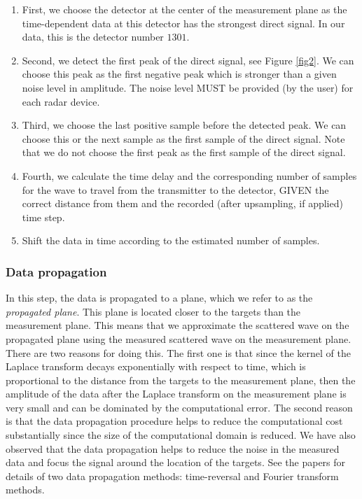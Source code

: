 \documentclass[a4paper,12pt]{article}
\begin{document}
\begin{enumerate}
   \item First, we choose the detector at the center of the measurement plane as the time-dependent data at this detector has the strongest direct signal. In our data, this is the detector number $1301$. 
   \item Second, we detect the first peak of the direct signal, see Figure \ref{fig2}. We can choose this peak as the first negative peak which is stronger than a given noise level in amplitude. The noise level MUST be provided (by the user) for each radar device. 
  \item Third, we choose the last positive sample before the detected peak. We can choose this or the next sample as the first sample of the direct signal. Note that we do not choose the first peak as the first sample of the direct signal. 
  \item Fourth, we calculate the time delay and the corresponding number of samples for the wave to travel from the transmitter to the detector, GIVEN the correct distance from them and the recorded (after upsampling, if applied) time step. 
  \item Shift the data in time according to the estimated number of samples. 
\end{enumerate}

\subsubsection{Data propagation}
In this step, the data is propagated to a plane, which we refer to as the \textit{propagated plane}.
This plane is located closer to the targets than the measurement plane. This
means that we approximate the scattered wave on the propagated plane using
the measured scattered wave on the measurement plane. There are two reasons
for doing this. The first one is that since the kernel
of the Laplace transform decays exponentially with respect to
time, which is proportional to the distance from the targets to the
measurement plane, then the amplitude of the data after the Laplace
transform on the measurement plane is very small and can be dominated by the
computational error. The second reason is that the data propagation
procedure helps to reduce the computational cost substantially since the
size of the computational domain is reduced. We have also observed
that the data propagation helps to reduce the noise in the measured data and focus the signal around the location of the targets. See the papers \cite{TBKF:SISC2014,TBKF:2013-2} for details of two data propagation methods: time-reversal and Fourier transform methods.
\end{document}
